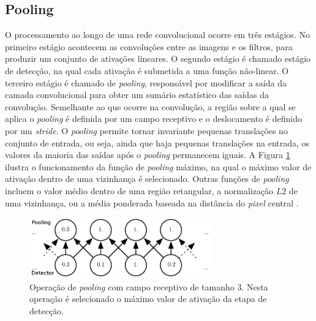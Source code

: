 \subsection{Pooling}
O processamento ao longo de uma rede convolucional ocorre em três estágios. No primeiro estágio
acontecem as convoluções entre as imagens e os filtros, para produzir um conjunto de ativações lineares.
O segundo estágio é chamado estágio de detecção, na qual cada ativação é submetida a uma
função não-linear. O terceiro estágio é chamado de \textit{pooling}, responsável por
modificar a saída da camada convolucional para obter um sumário estatístico das saídas da convolução.
Semelhante ao que ocorre na convolução, a região sobre a qual se aplica o \textit{pooling} é definida por um
campo receptivo e o deslocamento é definido por um \textit{stride}. O \textit{pooling} permite tornar
invariante pequenas translações no conjunto de entrada, ou seja, ainda que haja pequenas translações na
entrada, os valores da maioria das saídas após o \textit{pooling} permanecem iguais.
A Figura \ref{fig:pool} ilustra o funcionamento da função de \textit{pooling} máximo, na qual
o máximo valor de ativação dentro de uma vizinhança é selecionado. Outras funções de \textit{pooling}
incluem o valor médio dentro de uma região retangular, a normalização $L2$ de uma vizinhança, ou a
média ponderada baseada na distância do \textit{pixel} central \citep{Gdfl16}.
\begin{figure}[htp]
\begin{center}
  \includegraphics[width=0.7\textwidth]{fig/pool}
  \caption{Operação de \textit{pooling} com campo receptivo de tamanho $3$. Nesta operação é selecionado o máximo valor de ativação da etapa de detecção. \citep{Gdfl16}}
  \label{fig:pool}
\end{center}
\end{figure}

